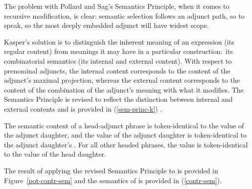 \documentclass[output=paper
	        ,collection
	        ,collectionchapter
 	        ,biblatex
                ,babelshorthands
                ,newtxmath
                ,draftmode
                ,colorlinks, citecolor=brown
]{langscibook}
\begin{document}
\begin{exe}
\ex\label{pot-contr-pl-sem}
\end{exe}

\noindent
The problem with Pollard and Sag's Semantics Principle, when it comes to recursive modification, is clear: semantic selection follows an adjunct path, so to speak, so the most deeply embedded adjunct will have widest scope. 

Kasper's solution is to distinguish the inherent meaning of an expression (its regular content) from meanings it may have in a particular construction:\ its combinatorial semantics (its internal and external content). With respect to prenominal adjuncts, the internal content corresponds to the content of the adjunct's maximal projection, whereas the external content corresponds to the content of the combination of the adjunct's meaning with what it modifies. The Semantics Principle is revised to reflect the distinction between internal and external contents and is provided in (\ref{sem-princ-k}) \citep[19]{Kasper1997}.

\begin{exe}
\ex\label{sem-princ-k}
\begin{xlist}
\ex\label{sem-princ-k-a}
The semantic content of a head-adjunct phrase is token-identical to the  value of the adjunct daughter, and the  value of the adjunct daughter is token-identical to the adjunct daughter's .
\ex\label{sem-princ-k-b}
For all other headed phrases, the  value is token-identical to the  value of the head daughter.
\end{xlist}
\end{exe}

The result of applying the revised Semantics Principle to  is provided in Figure~\ref{pot-contr-sem} and the semantics of  is provided in (\ref{contr-sem}).

\end{document}
